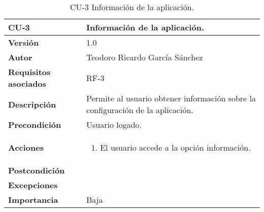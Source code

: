 \begin{table}[p]
	\centering
	\begin{tabularx}{\linewidth}{ p{} p{} }
		\toprule
		\textbf{CU-3}    & \textbf{Información de la aplicación.}\\
		\toprule
		\textbf{Versión}              & 1.0    \\
		\textbf{Autor}                & Teodoro Ricardo García Sánchez \\
		\textbf{Requisitos asociados} & RF-3 \\
		\textbf{Descripción}          & Permite al usuario obtener información sobre la configuración de la aplicación. \\
		\textbf{Precondición}         & Usuario logado. \\
		\textbf{Acciones}             &
		\begin{enumerate}
			\def\labelenumi{\arabic{enumi}.}
			\tightlist
			\item El usuario accede a la opción información.
		\end{enumerate}\\
		\textbf{Postcondición}        &  \\
		\textbf{Excepciones}          &  \\
		\textbf{Importancia}          & Baja \\
		\bottomrule
	\end{tabularx}
	\caption{CU-3 Información de la aplicación.}
\end{table}
